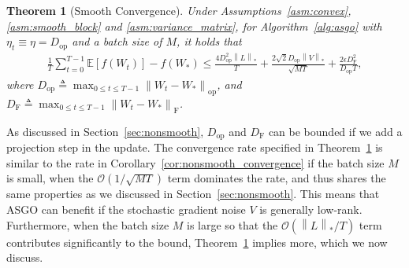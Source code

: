 \documentclass{article}
\newtheorem{theorem}{Theorem}
\theoremstyle{remark}
\newcommand{\Norm}[1]{\left\|#1\right\|}
\newcommand{\EE}{\mathbb{E}}
\newcommand{\cO}{\mathcal{O}}
\begin{document}
\begin{theorem}[Smooth Convergence]\label{thm:convex_smooth}
    Under Assumptions~\ref{asm:convex}, \ref{asm:smooth_block} and \ref{asm:variance_matrix}, for Algorithm~\ref{alg:asgo} with $\eta_t \equiv \eta = D_{\mathrm{op}}$ and a batch size of $M$, it holds that
    \begin{align*}
        \frac{1}{T} \sum_{t=0}^{T-1} \EE[f(W_t)] - f(W_*) \le \frac{4D_{\mathrm{op}}^2 \Norm{L}_*}{T} + \frac{2\sqrt{2} D_{\mathrm{op}} \Norm{V}_*}{\sqrt{MT}} + \frac{2\epsilon D_{\mathrm{F}}^2}{D_{\mathrm{op}} T} ,
    \end{align*}
    where $D_{\mathrm{op}} \triangleq \max_{0\le t\le T-1}\Norm{W_t - W_*}_{\mathrm{op}}$, and $D_{\mathrm{F}} \triangleq \max_{0\le t\le T-1}\Norm{W_t - W_*}_{\mathrm{F}}$.
\end{theorem}
As discussed in Section~\ref{sec:nonsmooth}, $D_{\mathrm{op}}$ and $D_{\mathrm{F}}$ can be bounded if we add a projection step in the update. The convergence rate specified in Theorem~\ref{thm:convex_smooth} is similar to the rate in Corollary~\ref{cor:nonsmooth_convergence} if the batch size $M$ is small, when the $\cO(1/\sqrt{MT})$ term dominates the rate, and thus shares the same properties as we discussed in Section~\ref{sec:nonsmooth}. This means that ASGO can benefit if the stochastic gradient noise $V$ is generally low-rank. Furthermore, when the batch size $M$ is large so that the $\cO(\Norm{L}_*/T)$ term contributes significantly to the bound, Theorem~\ref{thm:convex_smooth} implies more, which we now discuss.
\end{document}

